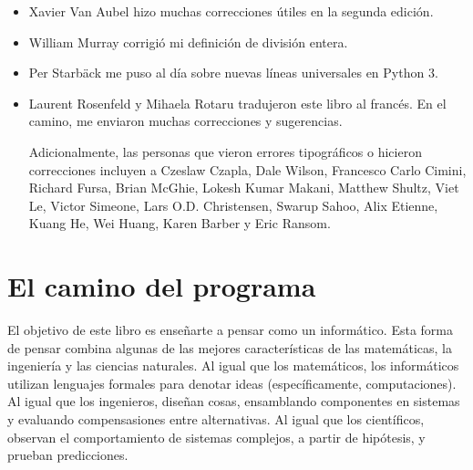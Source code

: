 \documentclass[10pt]{book}
\begin{document}
\begin{itemize}
\item Xavier Van Aubel hizo muchas correcciones útiles en la segunda
edición.

\item William Murray corrigió mi definición de división entera.

\item Per Starb{\"a}ck me puso al día sobre nuevas líneas universales en Python 3.

\item Laurent Rosenfeld y Mihaela Rotaru tradujeron este libro al francés.  En el camino, me enviaron muchas correcciones y sugerencias.


Adicionalmente, las personas que vieron errores tipográficos o hicieron correcciones incluyen a
Czeslaw Czapla, Dale Wilson, Francesco Carlo Cimini,
Richard Fursa, Brian McGhie, Lokesh Kumar Makani, Matthew Shultz, Viet
Le, Victor Simeone, Lars O.D. Christensen, Swarup Sahoo, Alix Etienne,
Kuang He, Wei Huang, Karen Barber y Eric Ransom.




\end{itemize}

\normalsize
\clearemptydoublepage

\begin{latexonly}

\tableofcontents

\clearemptydoublepage

\end{latexonly}

\mainmatter

\chapter{El camino del programa}

El objetivo de este libro es enseñarte a pensar como un informático. Esta forma
de pensar combina algunas de las mejores características de las matemáticas,
la ingeniería y las ciencias naturales.  Al igual que los matemáticos, los
informáticos utilizan lenguajes formales para denotar ideas (específicamente,
computaciones). Al igual que los ingenieros, diseñan cosas, ensamblando
componentes en sistemas y evaluando compensasiones entre alternativas.
Al igual que los científicos, observan el comportamiento de sistemas complejos,
a partir de hipótesis, y prueban predicciones.  
\end{document}
